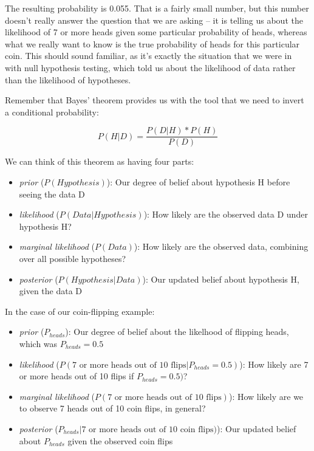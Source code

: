 \documentclass[
  12pt,
]{book}
\providecommand{\tightlist}{%
  \setlength{\itemsep}{0pt}\setlength{\parskip}{0pt}}
\begin{document}
The resulting probability is 0.055. That is a fairly small number, but this number doesn't really answer the question that we are asking -- it is telling us about the likelihood of 7 or more heads given some particular probability of heads, whereas what we really want to know is the true probability of heads for this particular coin. This should sound familiar, as it's exactly the situation that we were in with null hypothesis testing, which told us about the likelihood of data rather than the likelihood of hypotheses.

Remember that Bayes' theorem provides us with the tool that we need to invert a conditional probability:

\[
P(H|D) = \frac{P(D|H)*P(H)}{P(D)}
\]

We can think of this theorem as having four parts:

\begin{itemize}
\tightlist
\item
  \emph{prior} (\(P(Hypothesis)\)): Our degree of belief about hypothesis H before seeing the data D
\item
  \emph{likelihood} (\(P(Data|Hypothesis)\)): How likely are the observed data D under hypothesis H?
\item
  \emph{marginal likelihood} (\(P(Data)\)): How likely are the observed data, combining over all possible hypotheses?
\item
  \emph{posterior} (\(P(Hypothesis|Data)\)): Our updated belief about hypothesis H, given the data D
\end{itemize}

In the case of our coin-flipping example:

\begin{itemize}
\tightlist
\item
  \emph{prior} (\(P_{heads}\)): Our degree of belief about the likelhood of flipping heads, which was \(P_{heads}=0.5\)
\item
  \emph{likelihood} (\(P(\text{7 or more heads out of 10 flips}|P_{heads}=0.5)\)): How likely are 7 or more heads out of 10 flips if \(P_{heads}=0.5)\)?
\item
  \emph{marginal likelihood} (\(P(\text{7 or more heads out of 10 flips})\)): How likely are we to observe 7 heads out of 10 coin flips, in general?
\item
  \emph{posterior} (\(P_{heads}|\text{7 or more heads out of 10 coin flips})\)): Our updated belief about \(P_{heads}\) given the observed coin flips
\end{itemize}
\end{document}
